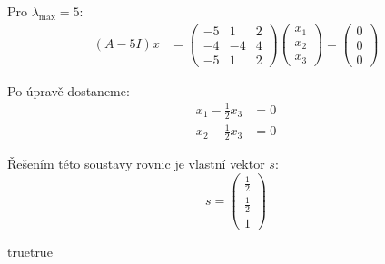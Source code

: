 \documentclass[10pt, a4paper]{ReportSheet}
\begin{document}
{        Pro $\lambda_{\max} = 5$:
        \begin{equation*}
            \begin{aligned}
            (A - 5I)
                x &= \begin{pmatrix}
                         -5 & 1  & 2 \\
                         -4 & -4 & 4 \\
                         -5 & 1  & 2
                \end{pmatrix} \begin{pmatrix}
                                  x_1 \\
                                  x_2 \\
                                  x_3
                \end{pmatrix} = \begin{pmatrix}
                                    0 \\
                                    0 \\
                                    0
                \end{pmatrix}
            \end{aligned}
        \end{equation*}

        Po úpravě dostaneme:
        \begin{equation*}
            \begin{aligned}
                x_1 - \frac{1}{2}x_3 &= 0 \\
                x_2 - \frac{1}{2}x_3 &= 0
            \end{aligned}
        \end{equation*}

        Řešením této soustavy rovnic je vlastní vektor $s$:
        \begin{equation*}
            s = \begin{pmatrix}
                    \frac{1}{2} \\
                    \frac{1}{2} \\
                    1
            \end{pmatrix}
        \end{equation*}

    }{true}{true}
\end{document}
